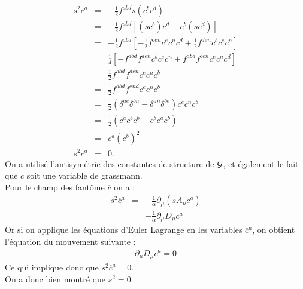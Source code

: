 \documentclass[a4paper,11pt]{article}
\theoremstyle{plain}
\theoremstyle{definition}
\theoremstyle{remark}
\numberwithin{equation}{section}
\numberwithin{equation}{subsection}
\numberwithin{figure}{section}
\begin{document}
\begin{eqnarray}
 s^2 c^{a} &=& - \frac{1}{2} f^{abd} s ( c^{b} c^{d} ) \\
                  &=& - \frac{1}{2} f^{abd} \left[ (s c^{b} ) c^{d}  - c^{b}  (s c^{d}) \right]\\
                  &=& - \frac{1}{2} f^{abd} \left[  - \frac{1}{2} f^{ben} c^{e}  c^{n}  c^{d} + \frac{1}{2} f^{den} c^{b}  c^{e}  c^{n}  \right]  \\
                  &=& \frac{1}{4} \left[  - f^{abd}  f^{den} c^{b}  c^{e}  c^{n}  +  f^{abd}  f^{ben} c^{e}  c^{n}  c^{d}   \right]\\
                  &=& \frac{1}{2}  f^{abd}  f^{den} c^{e}  c^{n}  c^{b} \\
                  &=& \frac{1}{2}  f^{abd}  f^{end} c^{e}  c^{n}  c^{b} \\
                  &=& \frac{1}{2}  \left(  \delta^{ae}  \delta^{bn} -  \delta^{an}  \delta^{be}  \right)  c^{e}  c^{n}  c^{b}  \\
                  &=& \frac{1}{2}  \left(  c^{a}  c^{b}  c^{b}  -  c^{b}  c^{a}  c^{b}  \right)  \\
                  &=& c^{a}  \left( c^{b}  \right)^{2}  \\
 s^2 c^{a} &=&0.
\end{eqnarray}
On a utilisé l'antisymétrie des constantes de structure de $\cal{G}$, et également le fait que $c$ soit une variable de grassmann. \\
Pour le champ des fantôme $\overline{c}$ on a :
\begin{eqnarray}
 s^2 \overline{c}^{a} &=& - \frac{1}{\alpha} \partial_{\mu} \left( s A_{\mu}c^{a} \right) \\
                                    &=& - \frac{1}{\alpha} \partial_{\mu} D_{\mu} c^{a}
\end{eqnarray}
Or si on applique les équations d'Euler Lagrange en les variables $\overline{c}^{a}$, on obtient l'équation du mouvement suivante :
\begin{eqnarray}
 \partial_{\mu} D_{\mu} c^{a} = 0
\end{eqnarray}
Ce qui implique donc que $s^2 \overline{c}^{a} =0$.\\

\noindent
On a donc bien montré que $s^2 =0 $.\\
\end{document}
